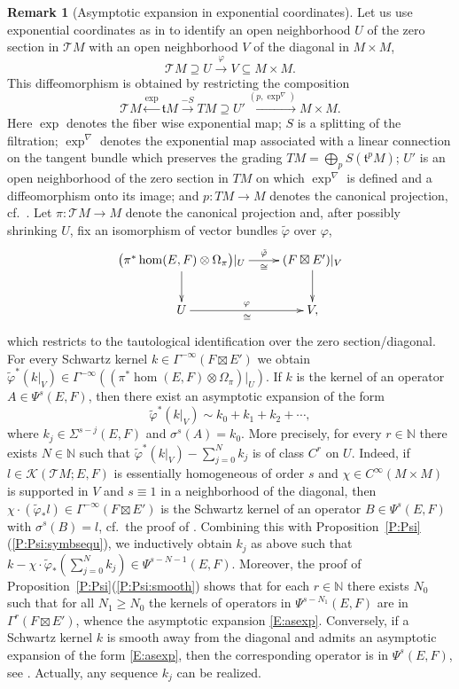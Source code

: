 \documentclass[reqno,12pt]{amsart}
\newcommand\N{\mathbb N}
\newcommand\itemref[1]{(\ref{#1})}
\theoremstyle{plain}
\theoremstyle{definition}
\newtheorem{remark}[theorem]{Remark}
\begin{document}
\begin{remark}[Asymptotic expansion in exponential coordinates]\label{R:expcoor}
Let us use exponential coordinates as in \cite{EY15} to identify an open neighborhood $U$ of the zero section in $\mathcal TM$ with an open neighborhood $V$ of the diagonal in $M\times M$,
$$
\mathcal TM\supseteq U\xrightarrow\varphi V\subseteq M\times M.
$$
This diffeomorphism is obtained by restricting the composition
$$
\mathcal TM\xleftarrow{\exp}\mathfrak tM\xrightarrow{-S}TM\supseteq U'\xrightarrow{(p,\exp^\nabla)}M\times M.
$$
Here $\exp$ denotes the fiber wise exponential map;
$S$ is a splitting of the filtration;
$\exp^\nabla$ denotes the exponential map associated with a linear connection on the tangent bundle which preserves the grading $TM=\bigoplus_pS(\mathfrak t^pM)$; 
$U'$ is an open neighborhood of the zero section in $TM$ on which $\exp^\nabla$ is defined and a diffeomorphism onto its image; and
$p\colon TM\to M$ denotes the canonical projection, cf.\ \cite[Equation~(22) in Section~3.7]{EY15}.
Let $\pi\colon\mathcal TM\to M$ denote the canonical projection and, after possibly shrinking $U$, fix an isomorphism of vector bundles $\tilde\varphi$ over $\varphi$, 
$$
\xymatrix{
\bigl(\pi^*\hom(E,F)\otimes\Omega_\pi\bigr)|_U\ar[d]\ar[r]^-{\tilde\varphi}_-\cong&(F\boxtimes E')|_V\ar[d]
\\
U\ar[r]^-\varphi_\cong&V,
}
$$ 
which restricts to the tautological identification over the zero section/diagonal. 
For every Schwartz kernel $k\in\Gamma^{-\infty}(F\boxtimes E')$ we obtain $\tilde\varphi^*(k|_V)\in\Gamma^{-\infty}((\pi^*\hom(E,F)\otimes\Omega_\pi)|_U)$.
If $k$ is the kernel of an operator $A\in\Psi^s(E,F)$, then there exist an asymptotic expansion of the form
\begin{equation}\label{E:asexp}
\tilde\varphi^*(k|_V)\sim k_0+k_1+k_2+\cdots,
\end{equation}
where $k_j\in\Sigma^{s-j}(E,F)$ and $\sigma^s(A)=k_0$.
More precisely, for every $r\in\N$ there exists $N\in\N$ such that $\tilde\varphi^*(k|_V)-\sum_{j=0}^Nk_j$ is of class $C^r$ on $U$.
Indeed, if $l\in\mathcal K(\mathcal TM;E,F)$ is essentially homogeneous of order $s$ and $\chi\in C^\infty(M\times M)$ is supported in $V$ and $s\equiv1$ in a neighborhood of the diagonal, then $\chi\cdot(\tilde\varphi_*l)\in\Gamma^{-\infty}(F\boxtimes E')$ is the Schwartz kernel of an operator $B\in\Psi^s(E,F)$ with $\sigma^s(B)=l$, cf.\ the proof of \cite[Lemma~50]{EY15}.
Combining this with Proposition~\ref{P:Psi}\itemref{P:Psi:symbsequ}, we inductively obtain $k_j$ as above such that $k-\chi\cdot\tilde\varphi_*(\sum_{j=0}^Nk_j)\in\Psi^{s-N-1}(E,F)$.
Moreover, the proof of Proposition~\ref{P:Psi}\itemref{P:Psi:smooth} shows that for each $r\in\N$ there exists $N_0$ such that for all $N_1\geq N_0$ the kernels of operators in $\Psi^{s-N_1}(E,F)$ are in $\Gamma^r(F\boxtimes E')$, whence the asymptotic expansion \eqref{E:asexp}. 
Conversely, if a Schwartz kernel $k$ is smooth away from the diagonal and admits an asymptotic expansion of the form \eqref{E:asexp}, then the corresponding operator is in $\Psi^s(E,F)$, see \cite[Theorem~76]{EY15}. 
Actually, any sequence $k_j$ can be realized.
\end{remark}
\end{document}
